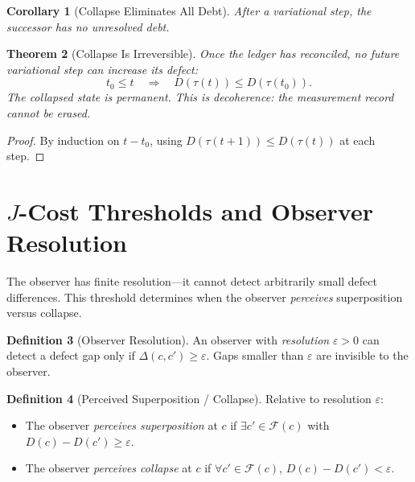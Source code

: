 \documentclass[11pt,a4paper]{article}
\theoremstyle{plain}
\newtheorem{theorem}{Theorem}[section]
\newtheorem{corollary}[theorem]{Corollary}
\theoremstyle{definition}
\newtheorem{definition}[theorem]{Definition}
\theoremstyle{remark}
\newcommand{\Jcost}{J}
\newcommand{\F}{\mathcal{F}}
\begin{document}
\begin{corollary}[Collapse Eliminates All Debt]\label{cor:nodebt}
After a variational step, the successor has no unresolved debt.
\end{corollary}

\begin{theorem}[Collapse Is Irreversible]\label{thm:irreversible}
Once the ledger has reconciled, no future variational step can increase its defect:
\[
t_0 \le t \quad\Longrightarrow\quad D(\tau(t)) \le D(\tau(t_0)).
\]
The collapsed state is permanent.
This is decoherence: the measurement record cannot be erased.
\end{theorem}

\begin{proof}
By induction on $t - t_0$, using $D(\tau(t{+}1)) \le D(\tau(t))$ at each step.
\end{proof}

\section{$\Jcost$-Cost Thresholds and Observer Resolution}\label{sec:threshold}

The observer has finite resolution---it cannot detect arbitrarily small defect differences.
This threshold determines when the observer \emph{perceives} superposition versus collapse.

\begin{definition}[Observer Resolution]\label{def:resolution}
An observer with \emph{resolution} $\varepsilon > 0$ can detect a defect gap only if $\Delta(c, c') \ge \varepsilon$.
Gaps smaller than $\varepsilon$ are invisible to the observer.
\end{definition}

\begin{definition}[Perceived Superposition / Collapse]\label{def:perceived}
Relative to resolution $\varepsilon$:
\begin{itemize}[nosep]
\item The observer \emph{perceives superposition} at $c$ if $\exists c' \in \F(c)$ with $D(c) - D(c') \ge \varepsilon$.
\item The observer \emph{perceives collapse} at $c$ if $\forall c' \in \F(c)$, $D(c) - D(c') < \varepsilon$.
\end{itemize}
\end{definition}
\end{document}
